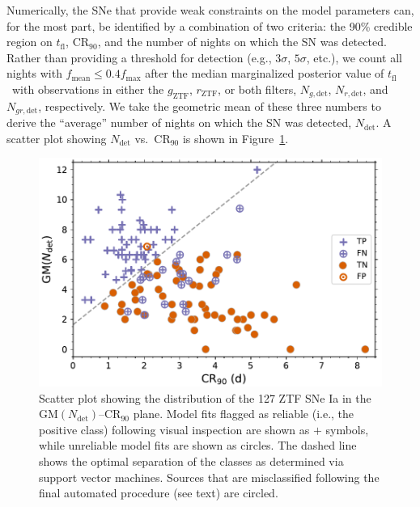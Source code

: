 \documentclass[twocolumn]{aastex63}
\newcommand{\rztf}{$r_\mathrm{ZTF}$}
\newcommand{\gztf}{$g_\mathrm{ZTF}$}
\newcommand{\tfl}{$t_\mathrm{fl}$}
\begin{document}
Numerically, the SNe that provide weak constraints on the model parameters
can, for the most part, be identified by a combination of two criteria: the
90\% credible region on \tfl, $\mathrm{CR}_{90}$, and the number of nights on
which the SN was detected. Rather than providing a threshold for detection
(e.g., $3\sigma$, $5\sigma$, etc.), we count all nights with $f_\mathrm{mean}
\le 0.4 f_\mathrm{max}$ after the median marginalized posterior value of
\tfl\ with observations in either the \gztf, \rztf, or both filters, $N_{g,
\mathrm{det}}$, $N_{r, \mathrm{det}}$, and $N_{gr, \mathrm{det}}$,
respectively. We take the geometric mean of these three numbers to derive the
``average'' number of nights on which the SN was detected, $N_\mathrm{det}$.
A scatter plot showing $N_\mathrm{det}$ vs.\ $\mathrm{CR}_{90}$ is shown in
Figure~\ref{fig:flagged_sn}.

\begin{figure}
    \centering
    \includegraphics[width=1\linewidth]{./figures/final_sample.pdf}
    \caption{Scatter plot showing the distribution of the  127  ZTF SNe Ia in the $\mathrm{GM}(N_\mathrm{det})$--$\mathrm{CR}_{90}$ plane. Model fits flagged as reliable (i.e., the positive class)  following visual inspection are shown as $+$ symbols, while  unreliable model fits are shown as circles. The dashed line shows the optimal separation of the classes as determined via support vector machines. Sources that are misclassified following the final automated procedure (see text) are circled.
    }
    \label{fig:flagged_sn}
\end{figure}
\end{document}
